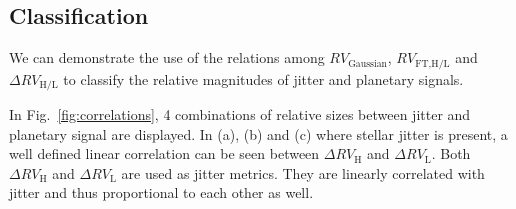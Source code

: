 \FloatBarrier

\subsection{Classification}
\label{sec:Classification}

We can demonstrate the use of the relations among $RV_\text{Gaussian}$, $RV_\text{FT,H/L}$ and $\Delta RV_\text{H/L}$ to classify the relative magnitudes of jitter and planetary signals. 

In Fig.~\ref{fig:correlations}, 4 combinations of relative sizes between jitter and planetary signal are displayed. In (a), (b) and (c) where stellar jitter is present, a well defined linear correlation can be seen between $\Delta RV_\text{H}$ and $\Delta RV_\text{L}$. Both $\Delta RV_\text{H}$ and $\Delta RV_\text{L}$ are used as jitter metrics. They are linearly correlated with jitter and thus proportional to each other as well. 

